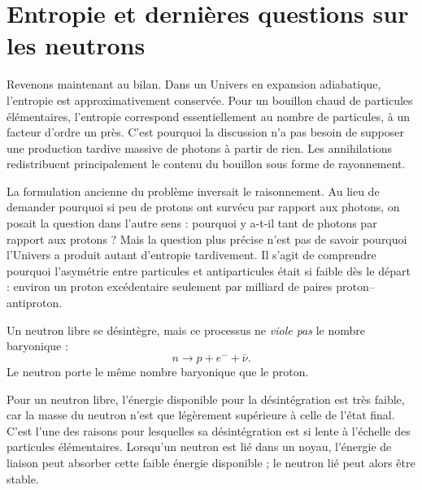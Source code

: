 \section{Entropie et dernières questions sur les neutrons}

Revenons maintenant au bilan. Dans un Univers en expansion adiabatique, l’entropie est approximativement conservée. Pour un bouillon chaud de particules élémentaires, l’entropie correspond essentiellement au nombre de particules, à un facteur d’ordre un près. C’est pourquoi la discussion n’a pas besoin de supposer une production tardive massive de photons à partir de rien. Les annihilations redistribuent principalement le contenu du bouillon sous forme de rayonnement.

La formulation ancienne du problème inversait le raisonnement. Au lieu de demander pourquoi si peu de protons ont survécu par rapport aux photons, on posait la question dans l’autre sens : pourquoi y a-t-il tant de photons par rapport aux protons ? Mais la question plus précise n’est pas de savoir pourquoi l’Univers a produit autant d’entropie tardivement. Il s’agit de comprendre pourquoi l’asymétrie entre particules et antiparticules était si faible dès le départ : environ un proton excédentaire seulement par milliard de paires proton--antiproton.

Un neutron libre se désintègre, mais ce processus ne \emph{viole pas} le nombre baryonique :
\[
n \to p + e^- + \bar\nu.
\]
Le neutron porte le même nombre baryonique que le proton.

Pour un neutron libre, l’énergie disponible pour la désintégration est très faible, car la masse du neutron n’est que légèrement supérieure à celle de l’état final. C’est l’une des raisons pour lesquelles sa désintégration est si lente à l’échelle des particules élémentaires. Lorsqu’un neutron est lié dans un noyau, l’énergie de liaison peut absorber cette faible énergie disponible ; le neutron lié peut alors être stable.

\begin{classroomqa}
\end{classroomqa}